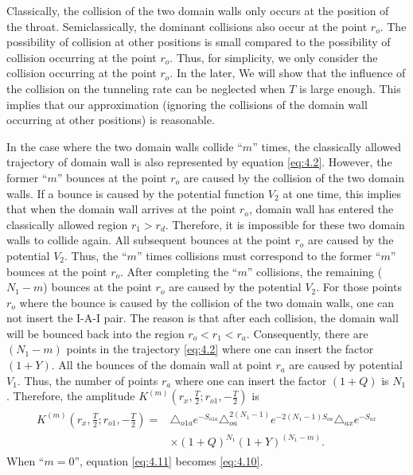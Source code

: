 \documentclass[12pt]{article}
\begin{document}
Classically, the collision of the two domain walls  only occurs at the position of the throat. Semiclassically, the dominant collisions also occur at the point $r_{o}$. The possibility of collision at other positions is small compared to the possibility of  collision occurring at the point $r_{o}$. Thus, for simplicity, we only consider the collision occurring at the point $r_{o}$.   In the later, We will show that the influence of the collision on the tunneling rate can be neglected when $T$ is large enough. This implies that our approximation (ignoring the collisions of the domain wall occurring at other positions) is reasonable.

In the case where the two domain walls collide ``$m$'' times, the classically allowed trajectory of domain wall \uppercase\expandafter{} is also represented by equation \eqref{eq:4.2}. However, the former ``$m$'' bounces at the point $r_{o}$ are caused by the collision of the two domain walls.   If a bounce is caused by the potential function $V_{2}$ at one time, this implies that when the domain wall  \uppercase\expandafter{} arrives at the point $r_{o}$, domain wall \uppercase\expandafter{} has entered the classically allowed region $r_{1}>r_{d}$. Therefore, it is impossible for these two domain walls to collide again.  All subsequent bounces  at the point $r_{o}$ are caused by the potential $V_{2}$. Thus, the ``$m$'' times collisions must correspond to the former ``$m$'' bounces at the point $r_{o}$. After completing the ``$m$'' collisions, the remaining ($N_{1}-m$) bounces at the point $r_{o}$ are caused by the potential $V_{2}$. For those points $r_{o}$ where the bounce is caused by the collision of the two domain walls, one can not insert the I-A-I pair. The reason is that after each collision, the domain wall \uppercase\expandafter{} will be bounced back into the region $r_{o}<r_{1}<r_{a}$. Consequently, there are $(N_{1}-m)$ points in the trajectory \eqref{eq:4.2} where one can insert the factor $(1+Y)$. All the bounces of the domain wall \uppercase\expandafter{} at point $r_{a}$ are caused by potential $V_{1}$. Thus, the number of points $r_{a}$ where one can insert the factor $(1+Q)$ is $N_{1}$. Therefore, the amplitude $K^{(m)}(r_{x},\frac{T}{2}; r_{o1}, -\frac{T}{2})$ is
\begin{eqnarray}\begin{split}
\label{eq:4.11}%
K^{(m)}(r_{x},\frac{T}{2}; r_{o1}, -\frac{T}{2})=&\triangle_{o1a}e^{-S_{o1a}}\triangle_{oa}^{2(N_{1}-1)}e^{-2(N_{1}-1)S_{oa}}\triangle_{ax}e^{-S_{ax}}\\&\times(1+Q)^{N_{1}}(1+Y)^{(N_{1}-m)}.
\end{split}
\end{eqnarray}
When ``$m=0$'', equation \eqref{eq:4.11} becomes \eqref{eq:4.10}.
\end{document}

